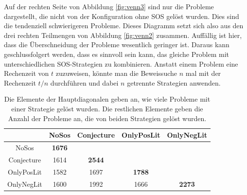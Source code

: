 		Auf der rechten Seite von Abbildung \ref{fig:venn3} sind nur die Probleme dargestellt, die nicht von der Konfiguration ohne SOS gelöst wurden. Dies sind die tendenziell schwierigeren Probleme. Dieses Diagramm setzt sich also aus den drei rechten Teilmengen von Abbildung \ref{fig:venn2} zusammen.
		Auffällig ist hier, dass die Überschneidung der Probleme wesentlich geringer ist. Daraus kann geschlussfolgert werden, dass es sinnvoll sein kann, das gleiche Problem mit unterschiedlichen SOS-Strategien zu kombinieren. Anstatt einem Problem eine Rechenzeit von $t$ zuzuweisen, könnte man die Beweissuche $n$ mal mit der Rechenzeit $t/n$ durchführen und dabei $n$ getrennte Strategien anwenden.
	
	
		\begin{table}
			\centering
			\begin{tabular}{|c|c|c|c|c|}
				\hline
				& NoSos & Conjecture & OnlyPosLit & OnlyNegLit \\ \hline
				NoSos & \textbf{1676} & & & \\ \hline
				Conjecture & 1614 & \textbf{2544} & & \\ \hline
				OnlyPosLit & 1582 & 1697 & \textbf{1788} & \\ \hline
				OnlyNegLit & 1600 & 1992 & 1666 & \textbf{2273} \\ \hline
				
			\end{tabular}
			\label{table:geloestSchnittmenge}
			\caption{Die Elemente der Hauptdiagonalen geben an, wie viele Probleme mit einer Strategie gelöst wurden. Die restlichen Elemente geben die Anzahl der Probleme an, die von beiden Strategien gelöst wurden.}
		\end{table}
	
